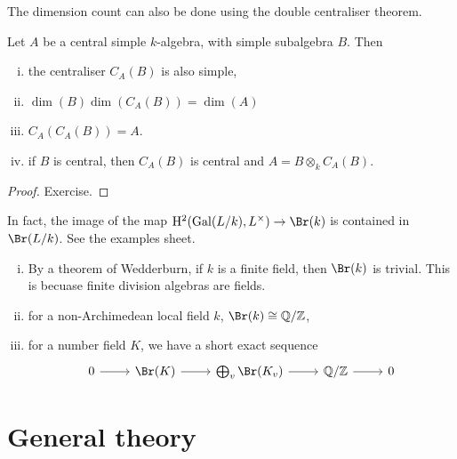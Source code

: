 \documentclass{article}
\begin{document}
\begin{remark}
    The dimension count can also be done using the double centraliser theorem.
\end{remark}

\begin{theorem}
     Let \(A\) be a central simple \(k\)-algebra, with simple subalgebra \(B\). Then
    \begin{enumerate}[(i)]
        \item the centraliser \(C_A(B)\) is also simple,
        \item \(\dim(B)\dim(C_A(B)) = \dim(A)\)
        \item \(C_A(C_A(B)) = A\).
        \item if \(B\) is central, then \(C_A(B)\) is central and \(A = B \otimes_k C_A(B)\).
    \end{enumerate}
\end{theorem}

\begin{proof}
    Exercise.
\end{proof}

In fact, the image of the map \(\HH^2(\Gal(L/k), L^\times) \to \Br(k)\) is contained in \(\Br(L/k)\). See the examples sheet.

\begin{remark}
    \begin{enumerate}[(i)]
        \item By a theorem of Wedderburn, if \(k\) is a finite field, then \(\Br(k)\) is trivial. This is becuase finite division algebras are fields.
        \item for a non-Archimedean local field \(k\), \(\Br(k) \cong \Q/\Z\),
        \item for a number field \(K\), we have a short exact sequence
        \[\begin{tikzcd}
            0 & {\Br(K)} & {\bigoplus_v\Br(K_v)} & {\Q/\Z} & 0
            \arrow[from=1-1, to=1-2]
            \arrow[from=1-2, to=1-3]
            \arrow[from=1-3, to=1-4]
            \arrow[from=1-4, to=1-5]
        \end{tikzcd}\]
    \end{enumerate}
\end{remark}

\section{General theory}
\end{document}
